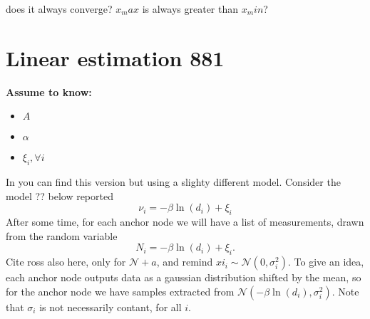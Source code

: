 \documentclass[12pt,twoside]{report}
\begin{document}
\begin{figure}
    \centering
    \caption{}
    \label{fig:mmax}
\end{figure}
does it always converge? $x_max$ is always greater than $x_min$?
\clearpage

\section{Linear estimation 881}
  \begin{center}
  \textbf{Assume to know:}
  \begin{itemize}
    \centering
    \item $A$
    \item $\alpha$
    \item $\xi_i,\forall i$
  \end{itemize}
  \end{center}
In \cite{rzk} you can find this version but using a slighty different model.
Consider the model ?? below reported
\begin{equation}
    \nu_i=-\beta\ln(d_i)+\xi_i
\end{equation}
After some time, for each anchor node we will have a list of measurements, drawn from the random variable 
\begin{equation}
N_i=-\beta\ln(d_i)+\xi_i.
\end{equation}
Cite ross also here, only for $\mathcal{N}+a$, and remind $xi_i\sim\mathcal{N}(0,\sigma^2_i)$. To give an idea, each anchor node outputs data as a gaussian distribution shifted by the mean, so for the anchor node we have samples extracted from $\mathcal{N}(-\beta\ln(d_i), \sigma_i^2)$. Note that $\sigma_i$ is not necessarily contant, for all $i$.
\end{document}
